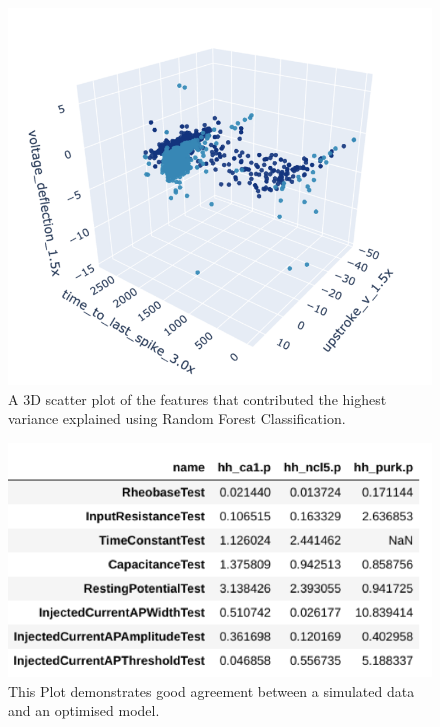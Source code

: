 \begin{figure}
	\includegraphics[width=\maxwidth{\textwidth}]{figures/directions_variance.png}
	\caption{A 3D scatter plot of the features that contributed the highest variance explained using Random Forest Classification.}
	\label{figure\arabic{figurecounter}}
\end{figure}
\begin{figure}
	\includegraphics[width=\maxwidth{\textwidth}]{figures/results_conductanc_models.png}
	\caption{This Plot demonstrates good agreement between a simulated data and an optimised model.}
	\label{figure\arabic{figurecounter}}
\end{figure}
